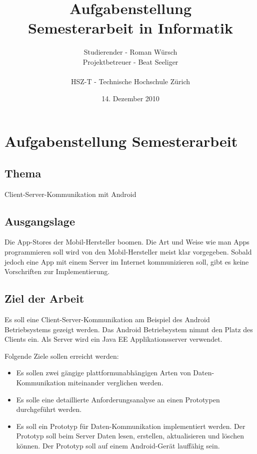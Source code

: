 \documentclass[listof=totoc,bibliography=totoc]{scrreprt}
\title{Aufgabenstellung\\
    Semesterarbeit in Informatik}
\author{Studierender - Roman Würsch\\
    Projektbetreuer - Beat Seeliger\\
    \\
    HSZ-T - Technische Hochschule Zürich}
\date{14. Dezember 2010}
\begin{document}
    \ifpdf
    \else
    \fi

    \maketitle



    \chapter{Aufgabenstellung Semesterarbeit}

    \section{Thema}
    Client-Server-Kommunikation mit Android
    
    \section{Ausgangslage}
    Die App-Stores der Mobil-Hersteller boomen. Die Art und Weise wie man Apps
    programmieren soll wird von den Mobil-Hersteller meist klar vorgegeben.
    Sobald jedoch eine App mit einem Server im Internet kommunizieren soll,
    gibt es keine Vorschriften zur Implementierung.

    \section{Ziel der Arbeit}
    Es soll eine Client-Server-Kommunikation am Beispiel des Android
    Betriebsystems gezeigt werden. Das Android Betriebsystem nimmt den
    Platz des Clients ein. Als Server wird ein Java EE Applikationsserver
    verwendet.\newline
    
    Folgende Ziele sollen erreicht werden:
    
    \begin{itemize}
        \item Es sollen zwei gängige plattformunabhängigen Arten von
            Daten-Kommunikation miteinander verglichen werden.
        \item Es solle eine detaillierte Anforderungsanalyse an einen
            Prototypen durchgeführt werden.
        \item Es soll ein Prototyp für Daten-Kommunikation implementiert
            werden. Der Prototyp soll beim Server Daten lesen, erstellen,
            aktualisieren und löschen können. Der Prototyp soll auf einem
            Android-Gerät lauffähig sein.
    \end{itemize}
    
\end{document}
